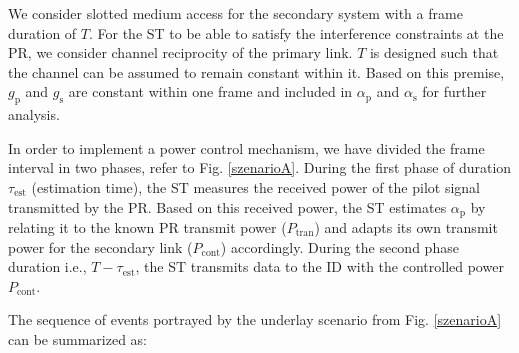 
We consider slotted medium access for the secondary system with a frame duration of $T$. For the ST to be able to satisfy the interference constraints at the PR, we consider channel reciprocity of the primary link. $T$ is designed such that the channel can be assumed to remain constant within it. Based on this premise, $g_\textrm{p}$ and $g_\textrm{s}$ are constant within one frame and included in $\alpha_\textrm{p}$ and $\alpha_\textrm{s}$ for further analysis.

In order to implement a power control mechanism, we have divided the frame interval in two phases, refer to Fig. \ref{szenarioA}. During the first phase of duration $\tau_\textrm{est}$ (estimation time), the ST measures the received power of the pilot signal transmitted by the PR. Based on this received power, the ST estimates $\alpha_\textrm{p}$ by relating it to the known PR transmit power ($P_\textrm{tran}$) and adapts its own transmit power for the secondary link ($P_\textrm{cont}$) accordingly. During the second phase duration i.e., $T-\tau_\textrm{est}$, the ST transmits data to the ID with the controlled power $P_\textrm{cont}$.

The sequence of events portrayed by the underlay scenario from Fig. \ref{szenarioA} can be summarized as:

